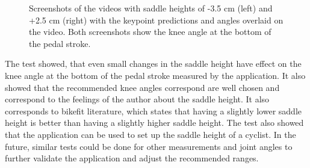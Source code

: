\begin{figure}[htbp]
    \hfill
    \caption{Screenshots of the videos with saddle heights of -3.5 cm (left) and +2.5 cm (right) with the keypoint predictions and angles overlaid on the video. Both screenshots show the knee angle at the bottom of the pedal stroke.}
    \label{fig:saddle_height_setup}

\end{figure}

The test showed, that even small changes in the saddle height have effect on the knee angle at the bottom of the pedal stroke measured by the application. It also showed that the recommended knee angles correspond are well chosen and correspond to the feelings of the author about the saddle height. It also corresponds to bikefit literature, which states that having a slightly lower saddle height is better than having a slightly higher saddle height. The test also showed that the application can be used to set up the saddle height of a cyclist. In the future, similar tests could be done for other measurements and joint angles to further validate the application and adjust the recommended ranges.

